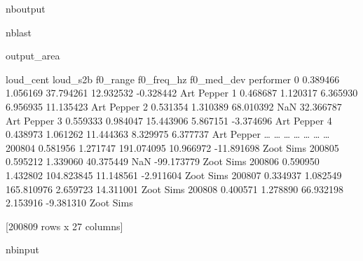 \documentclass[letterpaper,10pt,english]{sphinxmanual}
\begin{document}
\begin{sphinxuseclass}{nboutput}
\begin{sphinxuseclass}{nblast}
{\begin{sphinxuseclass}{output_area}
\begin{sphinxuseclass}{}
\begin{sphinxVerbatim}[commandchars=\\\{\}]
        loud\_cent  loud\_s2b    f0\_range  f0\_freq\_hz  f0\_med\_dev   performer
0        0.389466  1.056169   37.794261   12.932532   -0.328442  Art Pepper
1        0.468687  1.120317    6.365930    6.956935   11.135423  Art Pepper
2        0.531354  1.310389   68.010392         NaN   32.366787  Art Pepper
3        0.559333  0.984047   15.443906    5.867151   -3.374696  Art Pepper
4        0.438973  1.061262   11.444363    8.329975    6.377737  Art Pepper
{\ldots}           {\ldots}       {\ldots}         {\ldots}         {\ldots}         {\ldots}         {\ldots}
200804   0.581956  1.271747  191.074095   10.966972  -11.891698   Zoot Sims
200805   0.595212  1.339060   40.375449         NaN  -99.173779   Zoot Sims
200806   0.590950  1.432802  104.823845   11.148561   -2.911604   Zoot Sims
200807   0.334937  1.082549  165.810976    2.659723   14.311001   Zoot Sims
200808   0.400571  1.278890   66.932198    2.153916   -9.381310   Zoot Sims

[200809 rows x 27 columns]
\end{sphinxVerbatim}



\end{sphinxuseclass}
\end{sphinxuseclass}
}

\end{sphinxuseclass}
\end{sphinxuseclass}
\begin{sphinxuseclass}{nbinput}
{
\begin{sphinxVerbatim}[commandchars=\\\{\}]
\llap{\color{nbsphinxin}[43]:\,\hspace{\fboxrule}\hspace{\fboxsep}}
\end{sphinxVerbatim}
}

\end{sphinxuseclass}
\end{document}
